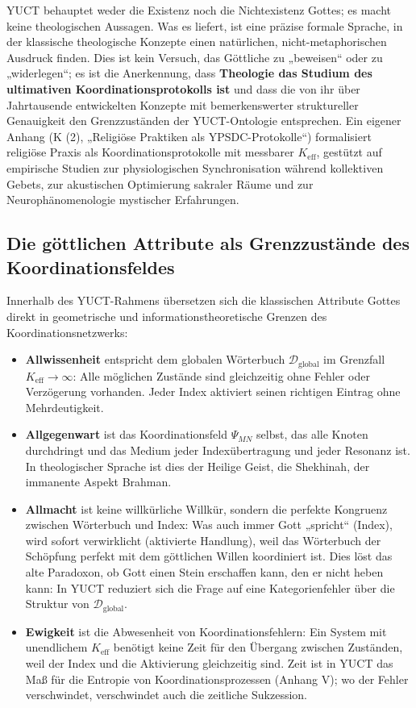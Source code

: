 \documentclass[12pt,a4paper]{article}
\begin{document}
	YUCT behauptet weder die Existenz noch die Nichtexistenz Gottes; es macht keine theologischen Aussagen. Was es liefert, ist eine präzise formale Sprache, in der klassische theologische Konzepte einen natürlichen, nicht-metaphorischen Ausdruck finden. Dies ist kein Versuch, das Göttliche zu „beweisen“ oder zu „widerlegen“; es ist die Anerkennung, dass \textbf{Theologie das Studium des ultimativen Koordinationsprotokolls ist} und dass die von ihr über Jahrtausende entwickelten Konzepte mit bemerkenswerter struktureller Genauigkeit den Grenzzuständen der YUCT-Ontologie entsprechen. Ein eigener Anhang (K (2), „Religiöse Praktiken als YPSDC-Protokolle“) formalisiert religiöse Praxis als Koordinationsprotokolle mit messbarer \(K_{\mathrm{eff}}\), gestützt auf empirische Studien zur physiologischen Synchronisation während kollektiven Gebets, zur akustischen Optimierung sakraler Räume und zur Neurophänomenologie mystischer Erfahrungen.
	
	\subsection{Die göttlichen Attribute als Grenzzustände des Koordinationsfeldes}
	
	Innerhalb des YUCT-Rahmens übersetzen sich die klassischen Attribute Gottes direkt in geometrische und informationstheoretische Grenzen des Koordinationsnetzwerks:
	
	\begin{itemize}[leftmargin=*]
		\item \textbf{Allwissenheit} entspricht dem globalen Wörterbuch \(\mathcal{D}_{\text{global}}\) im Grenzfall \(K_{\mathrm{eff}} \to \infty\): Alle möglichen Zustände sind gleichzeitig ohne Fehler oder Verzögerung vorhanden. Jeder Index aktiviert seinen richtigen Eintrag ohne Mehrdeutigkeit.
		\item \textbf{Allgegenwart} ist das Koordinationsfeld \(\Psi_{MN}\) selbst, das alle Knoten durchdringt und das Medium jeder Indexübertragung und jeder Resonanz ist. In theologischer Sprache ist dies der Heilige Geist, die Shekhinah, der immanente Aspekt Brahman.
		\item \textbf{Allmacht} ist keine willkürliche Willkür, sondern die perfekte Kongruenz zwischen Wörterbuch und Index: Was auch immer Gott „spricht“ (Index), wird sofort verwirklicht (aktivierte Handlung), weil das Wörterbuch der Schöpfung perfekt mit dem göttlichen Willen koordiniert ist. Dies löst das alte Paradoxon, ob Gott einen Stein erschaffen kann, den er nicht heben kann: In YUCT reduziert sich die Frage auf eine Kategorienfehler über die Struktur von \(\mathcal{D}_{\text{global}}\).
		\item \textbf{Ewigkeit} ist die Abwesenheit von Koordinationsfehlern: Ein System mit unendlichem \(K_{\mathrm{eff}}\) benötigt keine Zeit für den Übergang zwischen Zuständen, weil der Index und die Aktivierung gleichzeitig sind. Zeit ist in YUCT das Maß für die Entropie von Koordinationsprozessen (Anhang V); wo der Fehler verschwindet, verschwindet auch die zeitliche Sukzession.
	\end{itemize}
	
\end{document}
